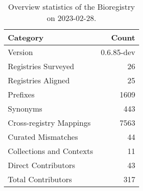 \begin{table}
\centering
\caption{Overview statistics of the Bioregistry on 2023-02-28.}
\label{tab:bioregistry-summary}
\begin{tabular}{lr}
\toprule
                Category &      Count \\
\midrule
                 Version & 0.6.85-dev \\
     Registries Surveyed &         26 \\
      Registries Aligned &         25 \\
                Prefixes &       1609 \\
                Synonyms &        443 \\
 Cross-registry Mappings &       7563 \\
      Curated Mismatches &         44 \\
Collections and Contexts &         11 \\
     Direct Contributors &         43 \\
      Total Contributors &        317 \\
\bottomrule
\end{tabular}
\end{table}
